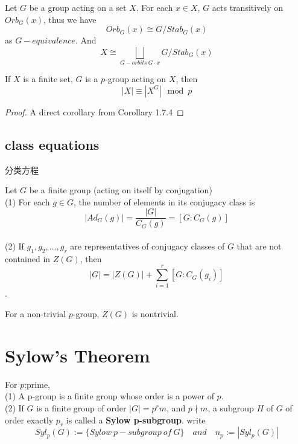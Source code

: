 \documentclass[11pt,fleqn]{book} %
\begin{document}
\begin{CJK}{UTF8}{gkai}
\begin{corollary}
	Let $G$ be a group acting on a set $X$. For each $x \in X$, $G$ acts transitively on $Orb_G(x)$, thus we have
	\[Orb_G(x) \cong G/Stab_G(x)\] as $G-equivalence$.
	And 
	\[X\cong \bigsqcup_{G-orbits \ G\cdot x} G/Stab_G(x)\] 
\end{corollary}

\begin{corollary}
	If $X$ is a finite set, $G$ is a $p$-group acting on $X$, then
	\[|X| \equiv |X^G| \mod p\]
\end{corollary}
\begin{proof}
	A direct corollary from Corollary 1.7.4
\end{proof}

\subsection{class equations}
分类方程
\begin{theorem}
	 Let $G$ be a finite group (acting on itself by conjugation) \\
	(1) For each $g \in G$, the number of elements in its conjugacy class is \[|Ad_G(g)| = \frac {|G|} {C_G(g)} = [G:C_G(g)]\] \\
	(2) If $g_1, g_2,...,g_r$ are representatives of conjugacy classes of $G$ that are not contained in $Z(G)$, then 
	\[|G| = |Z(G)| + \sum_{i=1}^r [G : C_G(g_i)]\].
\end{theorem}

\begin{proposition}
	For a non-trivial $p$-group, $Z(G)$ is nontrivial. 
\end{proposition}

\section{Sylow's Theorem}
\begin{definition}
	For $p$:prime, \\
	(1) A p-group is a finite group whose order is a power of $p$. \\
	(2) If $G$ is a finite group of order $|G|=p^rm$, and $p\nmid m$, a subgroup $H$ of $G$ of order exactly $p_r$ is called a {\bf Sylow p-subgroup}. write 
	\[Syl_p(G):=\{Sylow \ p-subgroup \ of \ G\} \quad and \quad n_p := |Syl_p(G)|\]
\end{definition}


\end{CJK}
\end{document}
